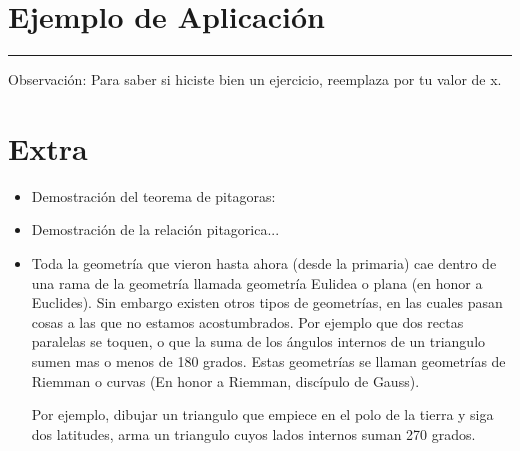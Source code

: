 \documentclass[a4paper,11pt,spanish,sans]{exam}
\begin{document}
\section{Ejemplo de Aplicación}

\rule[2ex]{\textwidth}{2pt}

Observación: Para saber si hiciste bien un ejercicio, reemplaza por tu valor de x.

\section*{Extra}

\begin{itemize}
\item Demostración del teorema de pitagoras:

\item Demostración de la relación pitagorica...%

\item Toda la geometría que vieron hasta ahora (desde la primaria) cae dentro de una rama de la geometría llamada geometría Eulidea o plana (en honor a Euclides).
Sin embargo existen otros tipos de geometrías, en las cuales pasan cosas a las que no estamos acostumbrados.
Por ejemplo que dos rectas paralelas se toquen, o que la suma  de los ángulos internos de un triangulo sumen mas o menos de 180 grados.
Estas geometrías se llaman geometrías de Riemman o curvas (En honor a Riemman, discípulo de Gauss).

Por ejemplo, dibujar un triangulo que empiece en el polo de la tierra y siga dos latitudes, arma un triangulo cuyos lados internos suman 270 grados.


\end{itemize}

%
%
\end{document}

